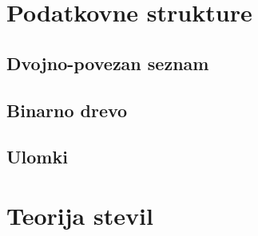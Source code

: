 \documentclass[10pt,a4paper,oneside]{book}
\begin{document}

\chapter{Podatkovne strukture}
\section{Dvojno-povezan seznam}

\section{Binarno drevo}

\section{Ulomki}



\chapter{Teorija stevil}
\end{document}
